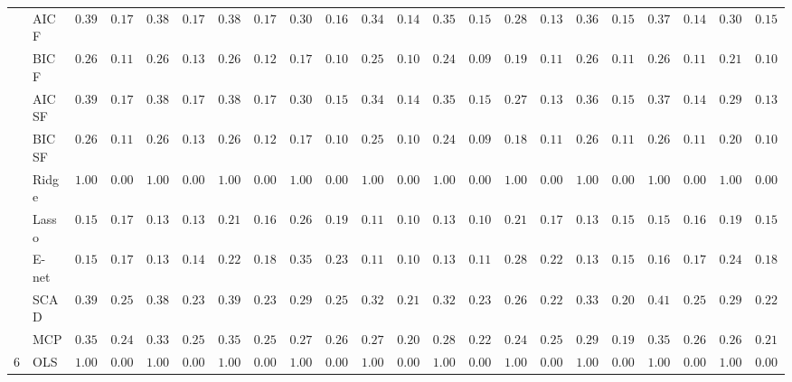 \begin{tabular}{p{0.2cm}p{1cm}|p{0.6cm}p{0.6cm}|p{0.6cm}p{0.6cm}p{0.6cm}p{0.6cm}p{0.6cm}p{0.6cm}|p{0.6cm}p{0.6cm}p{0.6cm}p{0.6cm}p{0.6cm}p{0.6cm}|p{0.6cm}p{0.6cm}p{0.6cm}p{0.6cm}p{0.6cm}p{0.6cm}}
 & AIC F  & $0.3933$ & $0.1733$ & $0.3850$ & $0.1736$ & $0.3833$ & $0.1781$ & $0.3050$ & $0.1625$ & $0.3450$ & $0.1484$ & $0.3517$ & $0.1533$ & $0.2800$ & $0.1379$ & $0.3667$ & $0.1553$ & $0.3717$ & $0.1496$ & $0.3017$ & $0.1511$ \\
 & BIC F  & $0.2683$ & $0.1158$ & $0.2667$ & $0.1361$ & $0.2600$ & $0.1215$ & $0.1783$ & $0.1066$ & $0.2567$ & $0.1017$ & $0.2467$ & $0.0990$ & $0.1950$ & $0.1186$ & $0.2650$ & $0.1138$ & $0.2667$ & $0.1161$ & $0.2100$ & $0.1076$ \\
 & AIC SF  & $0.3933$ & $0.1733$ & $0.3850$ & $0.1736$ & $0.3833$ & $0.1781$ & $0.3033$ & $0.1596$ & $0.3450$ & $0.1484$ & $0.3517$ & $0.1533$ & $0.2700$ & $0.1377$ & $0.3667$ & $0.1553$ & $0.3700$ & $0.1490$ & $0.2933$ & $0.1384$ \\
 & BIC SF  & $0.2683$ & $0.1158$ & $0.2667$ & $0.1361$ & $0.2600$ & $0.1215$ & $0.1767$ & $0.1055$ & $0.2567$ & $0.1017$ & $0.2467$ & $0.0990$ & $0.1883$ & $0.1128$ & $0.2650$ & $0.1138$ & $0.2667$ & $0.1161$ & $0.2083$ & $0.1043$ \\
 & Ridge  & $1.0000$ & $0.0000$ & $1.0000$ & $0.0000$ & $1.0000$ & $0.0000$ & $1.0000$ & $0.0000$ & $1.0000$ & $0.0000$ & $1.0000$ & $0.0000$ & $1.0000$ & $0.0000$ & $1.0000$ & $0.0000$ & $1.0000$ & $0.0000$ & $1.0000$ & $0.0000$ \\
 & Lasso  & $0.1550$ & $0.1729$ & $0.1300$ & $0.1331$ & $0.2117$ & $0.1689$ & $0.2683$ & $0.1952$ & $0.1183$ & $0.1067$ & $0.1300$ & $0.1075$ & $0.2133$ & $0.1790$ & $0.1317$ & $0.1504$ & $0.1517$ & $0.1626$ & $0.1917$ & $0.1505$ \\
 & E-net  & $0.1567$ & $0.1786$ & $0.1350$ & $0.1415$ & $0.2283$ & $0.1875$ & $0.3500$ & $0.2327$ & $0.1167$ & $0.1073$ & $0.1333$ & $0.1111$ & $0.2833$ & $0.2291$ & $0.1350$ & $0.1566$ & $0.1633$ & $0.1708$ & $0.2467$ & $0.1842$ \\
 & SCAD  & $0.3983$ & $0.2550$ & $0.3867$ & $0.2391$ & $0.3933$ & $0.2351$ & $0.2917$ & $0.2577$ & $0.3233$ & $0.2103$ & $0.3250$ & $0.2373$ & $0.2617$ & $0.2238$ & $0.3317$ & $0.2017$ & $0.4167$ & $0.2524$ & $0.2917$ & $0.2214$ \\
 & MCP  & $0.3533$ & $0.2419$ & $0.3333$ & $0.2540$ & $0.3533$ & $0.2565$ & $0.2783$ & $0.2649$ & $0.2783$ & $0.2079$ & $0.2817$ & $0.2218$ & $0.2483$ & $0.2501$ & $0.2950$ & $0.1951$ & $0.3500$ & $0.2600$ & $0.2617$ & $0.2109$ \\\hline
6 & OLS  & $1.0000$ & $0.0000$ & $1.0000$ & $0.0000$ & $1.0000$ & $0.0000$ & $1.0000$ & $0.0000$ & $1.0000$ & $0.0000$ & $1.0000$ & $0.0000$ & $1.0000$ & $0.0000$ & $1.0000$ & $0.0000$ & $1.0000$ & $0.0000$ & $1.0000$ & $0.0000$ \\

\end{tabular}
